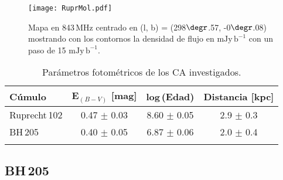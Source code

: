 \documentclass[baaa]{baaa}
\begin{document}

\begin{figure}[ht!]
\centering
 \texttt{[image: RuprMol.pdf]}
\caption{Mapa en 843\,MHz centrado en (l, b) = (298$\degr$.57, -0$\degr$.08) mostrando con los contornos la densidad de flujo en $\mathrm{mJy\,b}^{-1}$ con un paso de 15 $\mathrm{mJy\,b}^{-1}$.}
	\label{regionhii}
\end{figure}
 
\begin{table}
\centering
\caption{Par\'ametros fotom\'etricos de los CA investigados.}
\begin{tabular}{lccc}
\hline\hline\noalign{\smallskip}
\!\!C\'umulo & \!\!\!\!E$_{(B-V)}$ [mag] & \!\!\!\!log\,(Edad) & \!\!\!\!Distancia [kpc]\!\!\!\!\\
\hline\noalign{\smallskip}
\!\!Ruprecht\,102 & 0.47 $\pm$ 0.03 & 8.60 $\pm$ 0.05 & 2.9 $\pm$ 0.3\\
\!\!BH\,205  &  0.40 $\pm$ 0.05 & 6.87 $\pm$ 0.06 & 2.0 $\pm$ 0.4 \\
\hline
\label{datosfisicos}
\end{tabular}
\label{tabla1}
\end{table}

\subsection{BH\,205}


\end{document}
